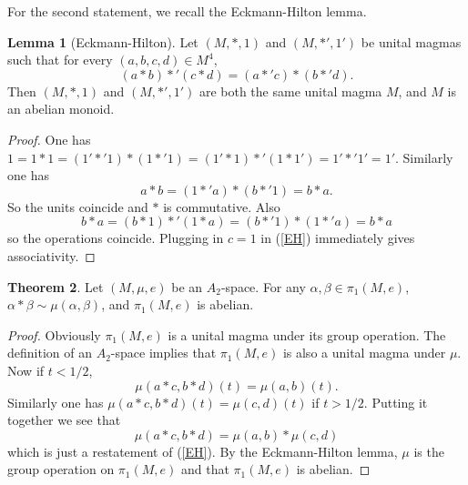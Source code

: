 \documentclass[10pt]{article}
\theoremstyle{definition}
\newtheorem{lemma}{Lemma}[exer]
\newtheorem{theorem}[lemma]{Theorem}
\begin{document}
For the second statement, we recall the Eckmann-Hilton lemma.

\begin{lemma}[Eckmann-Hilton]
Let $(M, *, 1)$ and $(M, *', 1')$ be unital magmas such that for every $(a, b, c, d) \in M^4$,
\begin{equation}
\label{EH}
(a * b) *' (c * d) = (a *' c) * (b *' d).
\end{equation}
Then $(M, *, 1)$ and $(M, *', 1')$ are both the same unital magma $M$, and $M$ is an abelian monoid.
\end{lemma}
\begin{proof}
One has $1 = 1 * 1 = (1' *' 1) * (1 *' 1) = (1' * 1) *' (1 * 1') = 1' *' 1' = 1'$.
Similarly one has
$$a * b = (1 *' a) * (b *' 1) = b * a.$$
So the units coincide and $*$ is commutative. Also
$$b * a = (b * 1) *' (1 * a) = (b *' 1) * (1 *' a) = b * a$$
so the operations coincide. Plugging in $c = 1$ in (\ref{EH}) immediately gives associativity.
\end{proof}

\begin{theorem}
Let $(M, \mu, e)$ be an $A_2$-space. For any $\alpha,\beta \in \pi_1(M, e)$, $\alpha*\beta \sim \mu(\alpha, \beta)$, and $\pi_1(M, e)$ is abelian.
\end{theorem}
\begin{proof}
Obviously $\pi_1(M, e)$ is a unital magma under its group operation.
The definition of an $A_2$-space implies that $\pi_1(M, e)$ is also a unital magma under $\mu$. Now if $t < 1/2$,
$$\mu(a*c, b*d)(t) = \mu(a, b)(t).$$
Similarly one has $\mu(a*c,b*d)(t) = \mu(c, d)(t)$ if $t > 1/2$. Putting it together we see that
$$\mu(a*c, b*d) = \mu(a, b) * \mu(c, d)$$
which is just a restatement of (\ref{EH}).
By the Eckmann-Hilton lemma, $\mu$ is the group operation on $\pi_1(M, e)$ and that $\pi_1(M, e)$ is abelian.
\end{proof}
\end{document}
